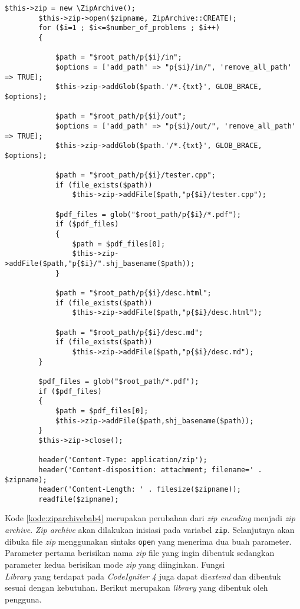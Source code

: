 \begin{lstlisting}[caption=Perancangan perubahan \textit{zip encoding} menjadi \textit{zip archive}, label=kode:ziparchivebab4]
$this->zip = new \ZipArchive();
		$this->zip->open($zipname, ZipArchive::CREATE);
		for ($i=1 ; $i<=$number_of_problems ; $i++)
		{

			$path = "$root_path/p{$i}/in";
			$options = ['add_path' => "p{$i}/in/", 'remove_all_path' => TRUE];
			$this->zip->addGlob($path.'/*.{txt}', GLOB_BRACE, $options);

			$path = "$root_path/p{$i}/out";
			$options = ['add_path' => "p{$i}/out/", 'remove_all_path' => TRUE];
			$this->zip->addGlob($path.'/*.{txt}', GLOB_BRACE, $options);

			$path = "$root_path/p{$i}/tester.cpp";
			if (file_exists($path))
				$this->zip->addFile($path,"p{$i}/tester.cpp");

			$pdf_files = glob("$root_path/p{$i}/*.pdf");
			if ($pdf_files)
			{
				$path = $pdf_files[0];
				$this->zip->addFile($path,"p{$i}/".shj_basename($path));
			}

			$path = "$root_path/p{$i}/desc.html";
			if (file_exists($path))
				$this->zip->addFile($path,"p{$i}/desc.html");

			$path = "$root_path/p{$i}/desc.md";
			if (file_exists($path))
				$this->zip->addFile($path,"p{$i}/desc.md");
		}

		$pdf_files = glob("$root_path/*.pdf");
		if ($pdf_files)
		{
			$path = $pdf_files[0];
			$this->zip->addFile($path,shj_basename($path));
		}
		$this->zip->close();
		
		header('Content-Type: application/zip');
		header('Content-disposition: attachment; filename=' . $zipname);
		header('Content-Length: ' . filesize($zipname));
		readfile($zipname);
\end{lstlisting}

Kode \ref{kode:ziparchivebab4} merupakan perubahan dari \textit{zip encoding} menjadi \textit{zip archive}. \textit{Zip archive} akan dilakukan inisiasi pada variabel \texttt{zip}. Selanjutnya akan dibuka file \textit{zip} menggunakan sintaks \texttt{open} yang menerima dua buah parameter. Parameter pertama berisikan nama \textit{zip} file yang ingin dibentuk sedangkan parameter kedua berisikan mode \textit{zip} yang diinginkan. Fungsi
\\
\textit{Library} yang terdapat pada \textit{CodeIgniter 4} juga dapat di\textit{extend} dan dibentuk sesuai dengan kebutuhan. Berikut merupakan \textit{library} yang dibentuk oleh pengguna.

